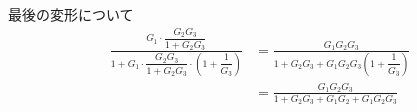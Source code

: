 \documentclass[a4paper,12pt]{article}
\begin{document}
\begin{tcolorbox}
\begin{center}
\begin{tikzpicture}[auto, node distance=1.5cm and 1.5cm, >=Latex]
    \end{tikzpicture}

  \end{center}


    \vspace{-2mm}
最後の変形について
    \begin{align*}
      \frac{G_1 \cdot \dfrac{G_2 G_3}{1 + G_2 G_3}}{1 + G_1 \cdot \dfrac{G_2 G_3}{1 + G_2 G_3} \cdot \left(1 + \dfrac{1}{G_3} \right)}
      &= \frac{G_1 G_2 G_3}{1 + G_2 G_3 + G_1 G_2 G_3 \left(1 + \dfrac{1}{G_3} \right)} \\[1ex]
      &= \frac{G_1 G_2 G_3}{1 + G_2 G_3 + G_1 G_2 + G_1 G_2 G_3}
    \end{align*}

\end{tcolorbox}
\end{document}
